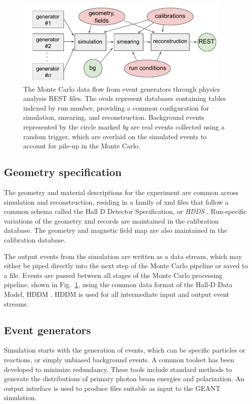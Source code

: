 \begin{figure}[t]\centering  
\includegraphics[width=0.95\textwidth]{figures/MonteCarlo_flow.pdf}
\caption[]{\label{fig:MC-data-flow}The Monte Carlo data flow from event generators through physics analysis REST files. The ovals represent databases containing tables indexed by run number, providing a common configuration for simulation, smearing, and reconstruction. Background events represented by the circle marked \emph{bg} are real events collected using a random trigger, which are overlaid on the simulated events to account for pile-up in the Monte Carlo.}
\end{figure}

\subsection[Geometry specification]{\label{sec:materialscan}Geometry specification}
The geometry and material descriptions for the experiment are common across simulation and reconstruction, residing in a family of xml files that follow a common schema called the Hall D Detector Specification, or \emph{HDDS} \cite{HDDS,gx732}. Run-specific variations of the geometry xml records are maintained in the calibration database. The geometry and magnetic field map are also maintained in the calibration database.

The output events from the simulation are written as a data stream, which may either be piped directly into the next step of the Monte Carlo pipeline or saved to a file. Events are passed between 
all stages of the Monte Carlo processing pipeline, shown in Fig.~\ref{fig:MC-data-flow}, using the common data format of the Hall-D Data Model, HDDM \cite{gx65}. HDDM is used for all intermediate input and output event streams.

\subsection{Event generators \label{sec:generators}}
Simulation starts with the generation of events, which can be specific particles or reactions, or simply unbiased background events. A common toolset has been developed to minimize redundancy. These tools include standard methods to generate the distributions of primary photon beam energies and polarization. An output interface is used to produce files suitable as input to the GEANT simulation.

